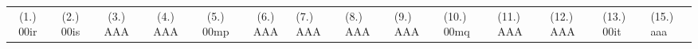 \begin{eocexercises}{}
\begin{enumerate}[itemsep=5pt, label=\textbf{\arabic*}. ]
  \end{enumerate}
\practiceinfo

\begin{tabular}{cccccc}
    (1.) 00ir& (2.) 00is& (3.) AAA& (4.) AAA& (5.) 00mp &
    (6.) AAA& (7.) AAA& (8.) AAA& (9.) AAA& (10.) 00mq &
    (11.) AAA& (12.) AAA& (13.) 00it &(15.) aaa \\
  \end{tabular}
\end{eocexercises}
